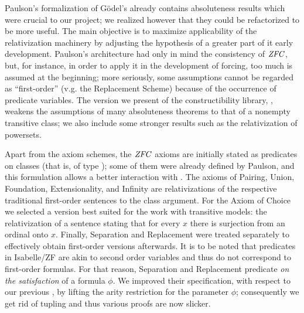 Paulson's formalization \cite{paulson_2003} of Gödel's \cite{godel-L}
already contains absoluteness results which were crucial to our
project; we realized however that they could be refactorized to be
more useful. The main objective is to maximize applicability of
the relativization machinery by adjusting the hypothesis of a greater
part of it early development. Paulson's architecture had only in mind
the consistency of $\mathit{ZFC}$, but, for instance, in order to apply it in
the development of forcing, too much is assumed at the beginning; more
seriously, some assumptions cannot be regarded as ``first-order''
(v.g. the Replacement Scheme) because of the occurrence of predicate
variables.
The version we present of the constructibility library,
, weakens the
assumptions of many absoluteness theorems to that
of a nonempty transitive class; we also include some stronger results
such as the relativization of powersets.

Apart from the axiom schemes, the $\mathit{ZFC}$ 
axioms are initially stated as predicates on classes (that is,
of type ); some
of them were already defined by Paulson, and this formulation allows a
better interaction with . 
The axioms of Pairing, Union, Foundation,
Extensionality, and Infinity are relativizations of the respective
traditional 
first-order sentences to the class argument. For the Axiom of Choice
we selected a version best suited for the work with transitive
models: the relativization of a sentence stating that for every $x$
there is surjection from an ordinal onto $x$. Finally, Separation and
Replacement were treated separately to effectively obtain first-order
versions afterwards. It is to be noted that predicates in Isabelle/ZF
are akin to second order variables and thus do not correspond to first-order
formulas.
For that reason, Separation and Replacement predicate \emph{on the
  satisfaction} of a formula $\phi$.  We improved their specification,
with respect to our previous \cite{2019arXiv190103313G}, by lifting
the arity restriction for the parameter $\phi$; consequently we
get rid of tupling and thus various proofs are now slicker.

